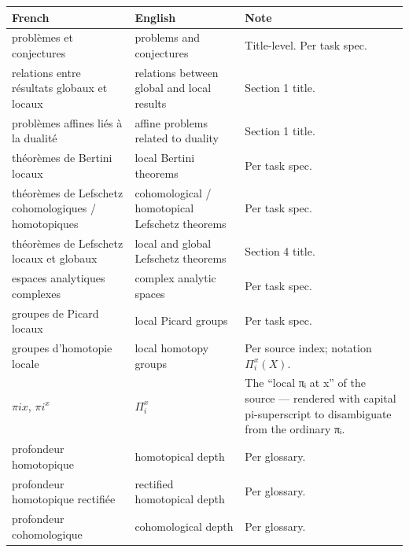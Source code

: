 \documentclass[
  11pt,
  a4paper,
]{book}
\newcounter{none} %
\begin{document}
{\def\LTcaptype{none} %
\begin{longtable}[]{@{}
  >{\raggedright\arraybackslash}p{}
  >{\raggedright\arraybackslash}p{}
  >{\raggedright\arraybackslash}p{}@{}}
\toprule\noalign{}
\begin{minipage}[b]{\linewidth}\raggedright
French
\end{minipage} & \begin{minipage}[b]{\linewidth}\raggedright
English
\end{minipage} & \begin{minipage}[b]{\linewidth}\raggedright
Note
\end{minipage} \\
\midrule\noalign{}
\endhead
\bottomrule\noalign{}
\endlastfoot
problèmes et conjectures & problems and conjectures & Title-level. Per
task spec. \\
relations entre résultats globaux et locaux & relations between global
and local results & Section 1 title. \\
problèmes affines liés à la dualité & affine problems related to duality
& Section 1 title. \\
théorèmes de Bertini locaux & local Bertini theorems & Per task spec. \\
théorèmes de Lefschetz cohomologiques / homotopiques & cohomological /
homotopical Lefschetz theorems & Per task spec. \\
théorèmes de Lefschetz locaux et globaux & local and global Lefschetz
theorems & Section 4 title. \\
espaces analytiques complexes & complex analytic spaces & Per task
spec. \\
groupes de Picard locaux & local Picard groups & Per task spec. \\
groupes d'homotopie locale & local homotopy groups & Per source index;
notation \(\Pi^{x}_{i}(X)\). \\
\(\pi ix\), \(\pi i^{x}\) & \(\Pi^{x}_{i}\) & The ``local πᵢ at x'' of
the source --- rendered with capital pi-superscript to disambiguate from
the ordinary πᵢ. \\
profondeur homotopique & homotopical depth & Per glossary. \\
profondeur homotopique rectifiée & rectified homotopical depth & Per
glossary. \\
profondeur cohomologique & cohomological depth & Per glossary. \\

\end{longtable}}
\end{document}
